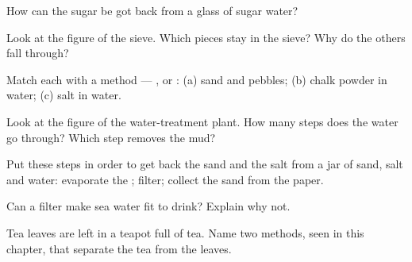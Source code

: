 \begin{exercise}[$\star$]\label{exo:g3:separating-mixtures:5}
How can the sugar be got back from a glass of sugar water?
\end{exercise}

\begin{exercise}[$\star$]\label{exo:g3:separating-mixtures:6}
Look at the figure of the sieve. Which pieces stay in the sieve? Why do
the others fall through?
\end{exercise}

\begin{exercise}[$\star$]\label{exo:g3:separating-mixtures:7}
Match each  with a method --- ,  or :
(a) sand and pebbles; (b) chalk powder in water; (c) salt in water.
\end{exercise}

\begin{exercise}[$\star$]\label{exo:g3:separating-mixtures:8}
Look at the figure of the water-treatment plant. How many steps does
the water go through? Which step removes the mud?
\end{exercise}

\begin{exercise}[$\star$]\label{exo:g3:separating-mixtures:9}
Put these steps in order to get back the sand and the salt from a jar of
sand, salt and water: evaporate the ; filter; collect the sand
from the paper.
\end{exercise}

\begin{exercise}[$\star\star$]\label{exo:g3:separating-mixtures:10}
Can a filter make sea water fit to drink? Explain why not.
\end{exercise}

\begin{exercise}[$\star\star$]\label{exo:g3:separating-mixtures:11}
Tea leaves are left in a teapot full of tea. Name two methods, seen in
this chapter, that separate the tea from the leaves.
\end{exercise}
